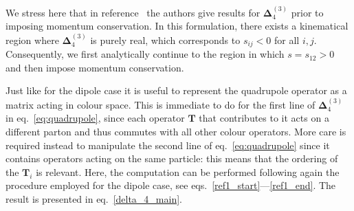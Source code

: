 %
We stress here that in reference~\cite{Almelid:2015jia}
the authors give results for $\mathbf{\Delta}^{(3)}_4$ prior to imposing momentum conservation.
In this formulation, there exists a kinematical region where $\mathbf{\Delta}^{(3)}_4$ 
is purely real, which corresponds to $s_{ij}<0$ for all $i,j$.  
Consequently, we first analytically continue to the region in which $s= s_{12} > 0$ and then impose momentum conservation.

Just like for the dipole case
it is useful to represent the quadrupole operator as a matrix acting 
in colour space.  This is immediate to do for the first line of $\mathbf{\Delta}_4^{(3)}$ in eq.~\eqref{eq:quadrupole},
since each operator $\mathbf{T}$ that contributes to it acts on a different parton 
and thus commutes with all  other colour operators.
More care is required instead to manipulate the second line of 
eq.~\eqref{eq:quadrupole} since it contains operators acting on the same particle: 
this means that the ordering of the $\mathbf{T}_i$ is relevant.  
Here, the computation can be performed following again the procedure employed for the dipole case, see 
eqs.~\eqref{ref1_start}---\eqref{ref1_end}. The
result is presented in eq.~\eqref{delta_4_main}.

